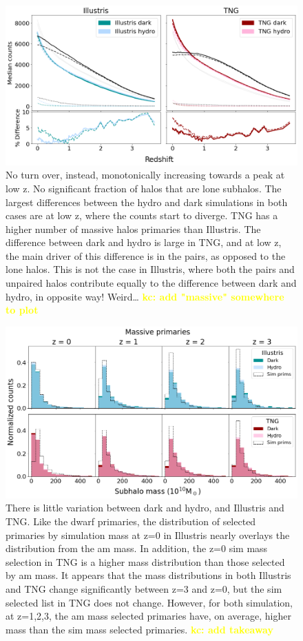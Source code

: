 \documentclass[twocolumn]{aastex631}
\newcommand{\kc}[1]{\textcolor{yellow}{\textbf{kc: #1}} }
\begin{document}
\begin{figure}[htb]
  \centering
  \includegraphics[width=\textwidth]{counts_massive.png}
  \caption{No turn over, instead, monotonically increasing towards a peak at low z. No significant fraction of halos that are lone subhalos. The largest differences between the hydro and dark simulations in both cases are at low z, where the counts start to diverge. TNG has a higher number of massive halos primaries than Illustris. The difference between dark and hydro is large in TNG, and at low z, the main driver of this difference is in the pairs, as opposed to the lone halos. This is not the case in Illustris, where both the pairs and unpaired halos contribute equally to the difference between dark and hydro, in opposite way! Weird… \kc{add "massive" somewhere to plot}
    }
  \label{fig:counts-massive}
\end{figure}

\begin{figure}[htb]
  \centering
  \includegraphics[width=\textwidth]{distributions_mass_massive.png}
  \caption{There is little variation between dark and hydro, and Illustris and TNG. Like the dwarf primaries, the distribution of selected primaries by simulation mass at z=0 in Illustris nearly overlays the distribution from the am mass. In addition, the z=0 sim mass selection in TNG is a higher mass distribution than those selected by am mass. It appears that the mass distributions in both Illustris and TNG change significantly between z=3 and z=0, but the sim selected list in TNG does not change. However, for both simulation, at z=1,2,3, the am mass selected primaries have, on average, higher mass than the sim mass selected primaries. \kc{add takeaway} 
    }
  \label{fig:dist-mass-massive}
\end{figure}
\end{document}
